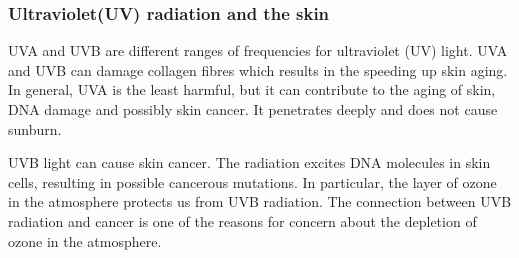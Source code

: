             \subsubsection*{Ultraviolet(UV) radiation and the skin}
            \nopagebreak
        \label{m38779*id189482}UVA and UVB are different ranges of frequencies for ultraviolet (UV) light. UVA and UVB can damage collagen fibres which results in the speeding up skin aging. In general, UVA is the least harmful, but it can contribute to the aging of skin, DNA damage and possibly skin cancer. It penetrates deeply and does not cause sunburn. \par 
        \label{m38779*id189490}UVB light can cause skin cancer. The radiation excites DNA molecules in skin cells, resulting in possible cancerous mutations. In particular, the layer of ozone in the atmosphere protects us from UVB radiation. The connection between UVB radiation and cancer is one of the reasons for concern about the depletion of ozone in the atmosphere.\par 
        
